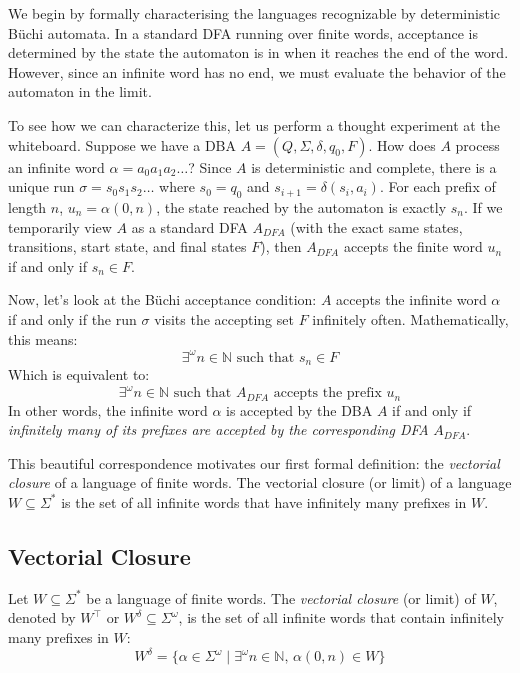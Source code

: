 We begin by formally characterising the languages recognizable by deterministic Büchi automata. In a standard DFA running over finite words, acceptance is determined by the state the automaton is in when it reaches the end of the word. However, since an infinite word has no end, we must evaluate the behavior of the automaton in the limit.

To see how we can characterize this, let us perform a thought experiment at the whiteboard. Suppose we have a DBA $A = (Q, \Sigma, \delta, q_0, F)$. How does $A$ process an infinite word $\alpha = a_0 a_1 a_2 \dots$?
Since $A$ is deterministic and complete, there is a unique run $\sigma = s_0 s_1 s_2 \dots$ where $s_0 = q_0$ and $s_{i+1} = \delta(s_i, a_i)$.
For each prefix of length $n$, $u_n = \alpha(0,n)$, the state reached by the automaton is exactly $s_n$.
If we temporarily view $A$ as a standard DFA $A_{DFA}$ (with the exact same states, transitions, start state, and final states $F$), then $A_{DFA}$ accepts the finite word $u_n$ if and only if $s_n \in F$.

Now, let's look at the Büchi acceptance condition: $A$ accepts the infinite word $\alpha$ if and only if the run $\sigma$ visits the accepting set $F$ infinitely often. Mathematically, this means:
$$\exists^\omega n \in \mathbb{N} \text{ such that } s_n \in F$$
Which is equivalent to:
$$\exists^\omega n \in \mathbb{N} \text{ such that } A_{DFA} \text{ accepts the prefix } u_n$$
In other words, the infinite word $\alpha$ is accepted by the DBA $A$ if and only if \emph{infinitely many of its prefixes are accepted by the corresponding DFA} $A_{DFA}$.

This beautiful correspondence motivates our first formal definition: the \emph{vectorial closure} of a language of finite words. The vectorial closure (or limit) of a language $W \subseteq \Sigma^*$ is the set of all infinite words that have infinitely many prefixes in $W$.

\subsection{Vectorial Closure}
\label{subsec:vectorial-closure}

\begin{definition}
Let $W \subseteq \Sigma^*$ be a language of finite words. The \emph{vectorial closure} (or limit) of $W$, denoted by $W^\top$ or $W^\delta \subseteq \Sigma^\omega$, is the set of all infinite words that contain infinitely many prefixes in $W$:
$$W^\delta = \{ \alpha \in \Sigma^\omega \mid \exists^\omega n \in \mathbb{N}, \, \alpha(0,n) \in W \}$$
\end{definition}

